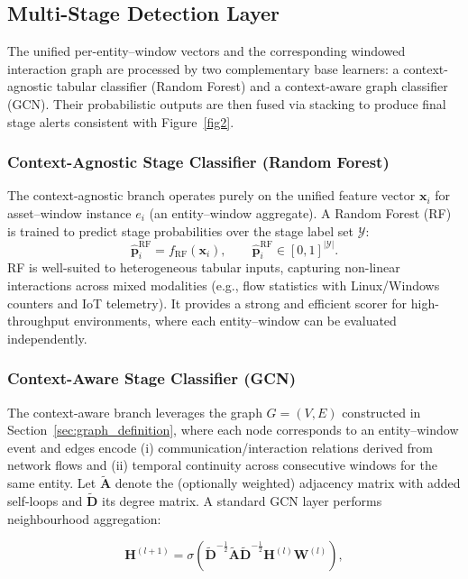 \documentclass[pdflatex,sn-mathphys-num]{sn-jnl}
\theoremstyle{thmstyleone}%
\theoremstyle{thmstyletwo}%
\theoremstyle{thmstylethree}%
\begin{document}
\subsection{Multi-Stage Detection Layer}
\label{sec:framework_detection_layer}
The unified per-entity--window vectors and the corresponding windowed interaction graph are processed by two complementary base learners: a context-agnostic tabular classifier (Random Forest) and a context-aware graph classifier (GCN). Their probabilistic outputs are then fused via stacking to produce final stage alerts consistent with Figure~\ref{fig2}.

\subsubsection{Context-Agnostic Stage Classifier (Random Forest)}
\label{sec:framework_rf}
The context-agnostic branch operates purely on the unified feature vector $\mathbf{x}_i$ for asset–window instance $e_i$ (an entity--window aggregate). A Random Forest (RF) is trained to predict stage probabilities over the stage label set $\mathcal{Y}$:
\begin{equation}
\hat{\mathbf{p}}^{\text{RF}}_i = f_{\text{RF}}(\mathbf{x}_i), 
\qquad 
\hat{\mathbf{p}}^{\text{RF}}_i \in [0,1]^{|\mathcal{Y}|}.
\end{equation}
RF is well-suited to heterogeneous tabular inputs, capturing non-linear interactions across mixed modalities (e.g., flow statistics with Linux/Windows counters and IoT telemetry). It provides a strong and efficient scorer for high-throughput environments, where each entity--window can be evaluated independently.

\subsubsection{Context-Aware Stage Classifier (GCN)}
\label{sec:framework_gcn}
The context-aware branch leverages the graph $G=(V,E)$ constructed in Section~\ref{sec:graph_definition}, where each node corresponds to an entity--window event and edges encode (i) communication/interaction relations derived from network flows and (ii) temporal continuity across consecutive windows for the same entity. Let $\tilde{\mathbf{A}}$ denote the (optionally weighted) adjacency matrix with added self-loops and $\tilde{\mathbf{D}}$ its degree matrix. A standard GCN layer performs neighbourhood aggregation:

\begin{equation}
\label{eq:gcn_layer}
\mathbf{H}^{(l+1)}=\sigma\!\left(\tilde{\mathbf{D}}^{-\frac{1}{2}}\tilde{\mathbf{A}}\tilde{\mathbf{D}}^{-\frac{1}{2}}\mathbf{H}^{(l)}\mathbf{W}^{(l)}\right),
\end{equation}
\end{document}
